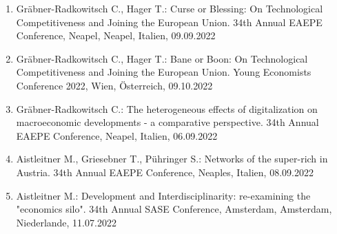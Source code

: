 \begin{enumerate}
	\item Gräbner-Radkowitsch C., Hager T.: Curse or Blessing: On Technological Competitiveness and Joining the European Union. 34th Annual EAEPE Conference, Neapel, Neapel, Italien, 09.09.2022
	\item Gräbner-Radkowitsch C., Hager T.: Bane or Boon: On Technological Competitiveness and Joining the European Union. Young Economists Conference 2022, Wien, Österreich, 09.10.2022
	\item Gräbner-Radkowitsch C.: The heterogeneous effects of digitalization on macroeconomic developments - a comparative perspective. 34th Annual EAEPE Conference, Neapel, Italien, 06.09.2022
	\item Aistleitner M., Griesebner T., Pühringer S.: Networks of the super-rich in Austria. 34th Annual EAEPE Conference, Neaples, Italien, 08.09.2022
	\item Aistleitner M.: Development and Interdisciplinarity: re-examining the "economics silo". 34th Annual SASE Conference, Amsterdam, Amsterdam, Niederlande, 11.07.2022
\end{enumerate}

